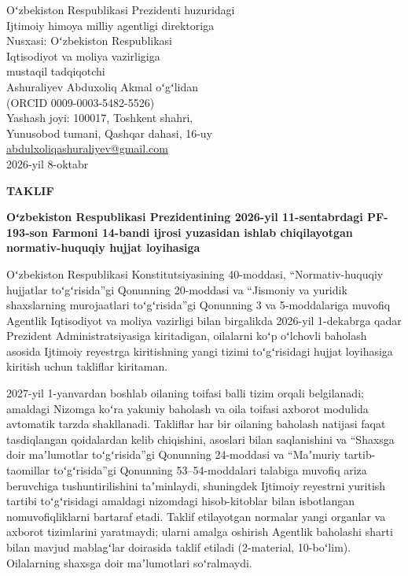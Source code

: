 \documentclass[14pt,a4paper]{extarticle}
\begin{document}
\begin{flushright}
Oʻzbekiston Respublikasi Prezidenti huzuridagi\\
Ijtimoiy himoya milliy agentligi direktoriga\\[2mm]
Nusxasi: Oʻzbekiston Respublikasi\\
Iqtisodiyot va moliya vazirligiga\\[4mm]
mustaqil tadqiqotchi\\
Ashuraliyev Abduxoliq Akmal oʻgʻlidan\\
(ORCID 0009-0003-5482-5526)\\
Yashash joyi: 100017, Toshkent shahri,\\
Yunusobod tumani, Qashqar dahasi, 16-uy\\
\href{mailto:abdulxoliqashuraliyev@gmail.com}{abdulxoliqashuraliyev@gmail.com}\\[2mm]
2026-yil 8-oktabr
\end{flushright}

\begin{center}\textbf{TAKLIF}\par
\textbf{Oʻzbekiston Respublikasi Prezidentining 2026-yil 11-sentabrdagi PF-193-son Farmoni 14-bandi ijrosi yuzasidan ishlab chiqilayotgan normativ-huquqiy hujjat loyihasiga}\end{center}

Oʻzbekiston Respublikasi Konstitutsiyasining 40-moddasi, “Normativ-huquqiy hujjatlar toʻgʻrisida”gi Qonunning 20-moddasi va “Jismoniy va yuridik shaxslarning murojaatlari toʻgʻrisida”gi Qonunning 3 va 5-moddalariga muvofiq Agentlik Iqtisodiyot va moliya vazirligi bilan birgalikda 2026-yil 1-dekabrga qadar Prezident Administratsiyasiga kiritadigan, oilalarni koʻp oʻlchovli baholash asosida Ijtimoiy reyestrga kiritishning yangi tizimi toʻgʻrisidagi hujjat loyihasiga kiritish uchun takliflar kiritaman.

2027-yil 1-yanvardan boshlab oilaning toifasi balli tizim orqali belgilanadi; amaldagi Nizomga koʻra yakuniy baholash va oila toifasi axborot modulida avtomatik tarzda shakllanadi. Takliflar har bir oilaning baholash natijasi faqat tasdiqlangan qoidalardan kelib chiqishini, asoslari bilan saqlanishini va “Shaxsga doir maʼlumotlar toʻgʻrisida”gi Qonunning 24-moddasi va “Maʼmuriy tartib-taomillar toʻgʻrisida”gi Qonunning 53–54-moddalari talabiga muvofiq ariza beruvchiga tushuntirilishini taʼminlaydi, shuningdek Ijtimoiy reyestrni yuritish tartibi toʻgʻrisidagi amaldagi nizomdagi hisob-kitoblar bilan isbotlangan nomuvofiqliklarni bartaraf etadi. Taklif etilayotgan normalar yangi organlar va axborot tizimlarini yaratmaydi; ularni amalga oshirish Agentlik baholashi sharti bilan mavjud mablagʻlar doirasida taklif etiladi (2-material, 10-boʻlim). Oilalarning shaxsga doir maʼlumotlari soʻralmaydi.
\end{document}
